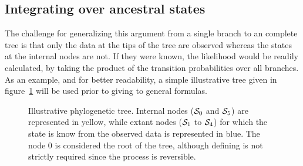 \subsection{Integrating over ancestral states}
The challenge for generalizing this argument from a single branch to an complete tree is that only the data at the tips of the tree are observed whereas the states at the internal nodes are not.
If they were known, the likelihood would be readily calculated, by taking the product of the transition probabilities over all branches.
As an example, and for better readability, a simple illustrative tree given in figure~\ref{fig:tree} will be used \gls{prior} to giving to general formulas.
\begin{figure}[H]
    \centering
    \caption[Illustrative phylogenetic tree]{
    Illustrative phylogenetic tree.
    Internal nodes ($\mathcal{S}_0$ and $\mathcal{S}_5$) are represented in yellow, while extant nodes ($\mathcal{S}_1$ to $\mathcal{S}_4$) for which the state is know from the observed data is represented in blue.
    The node $0$ is considered the root of the tree, although defining is not strictly required since the process is reversible.}
    \label{fig:tree}%
\end{figure}

